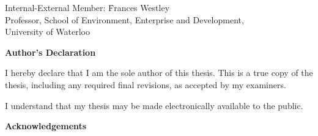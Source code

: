   \noindent
  \begin{tabbing}
Internal-External Member: \=  Frances Westley \\ %
\> Professor, School of Environment, Enterprise and Development, \\
\> University of Waterloo \\
\end{tabbing}
  \bigskip


  

\cleardoublepage
{}    %

 \begin{center}\textbf{Author's Declaration}\end{center}
  
 \noindent
I hereby declare that I am the sole author of this thesis. This is a true copy of the thesis, including any required final revisions, as accepted by my examiners.

  \bigskip
  
  \noindent
I understand that my thesis may be made electronically available to the public.

\cleardoublepage
{}    %




\cleardoublepage
{}    %

\begin{center}\textbf{Acknowledgements}\end{center}


